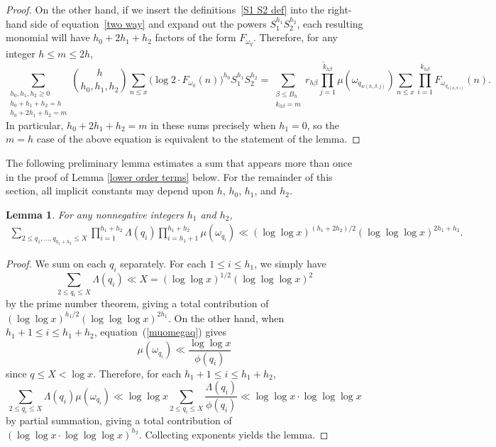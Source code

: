 \documentclass[12pt,reqno]{amsart}
\newtheorem{lemma}[theorem]{Lemma}
\theoremstyle{definition}
\begin{document}
\begin{proof}
On the other hand, if we insert the definitions~\eqref{S1 S2 def} into the right-hand side of equation~\eqref{two way} and expand out the powers $S_1^{h_1}S_2^{h_2}$, each resulting monomial will have $h_0+2h_1+h_2$ factors of the form $F_{\omega_q}$. Therefore, for any integer $h\le m\le 2h$,
\[
\sum_{\substack{h_0,h_1,h_2\ge0 \\ h_0+h_1+h_2=h \\ h_0+2h_1+h_2=m}} \binom h{h_0,h_1,h_2} \sum_{n \leq x} \big( \log 2 \cdot F_{\omega_0}(n) \big)^{h_0} S_1^{h_1}S_2^{h_2}
= 
\sum_{\substack{\beta\le B_h \\ k_{h\beta}=m}} r_{h\beta} \prod_{j=1}^{\tilde k_{h\beta}} \mu(\omega_{q_{w(h,\beta, j)}}) \sum_{n \leq x} \prod_{i=1}^{k_{h\beta}} F_{\omega_{q_{v(h,\beta, i)}}}(n).
\]
In particular, $h_0+2h_1+h_2=m$ in these sums precisely when $h_1=0$, so the $m=h$ case of the above equation is equivalent to the statement of the lemma.
\end{proof}

The following preliminary lemma estimates a sum that appears more than once in the proof of Lemma \ref{lower order terms} below. For the remainder of this section, all implicit constants may depend upon $h$, $h_0$, $h_1$, and $h_2$.

\begin{lemma}\label{sumlambdamu}
For any nonnegative integers $h_1$ and $h_2$,
\begin{align*}
\sum_{2\le q_1, \ldots, q_{h_1 + h_2} \leq X} \prod_{i = 1}^{h_1 + h_2} \Lambda(q_i) \prod_{i = h_1 + 1}^{h_1 + h_2} \mu(\omega_{q_i}) \ll (\log\log x)^{(h_1 + 2h_2)/2}(\log\log\log x)^{2h_1 + h_2}.
\end{align*}
\end{lemma}

\begin{proof}
We sum on each $q_i$ separately. For each $1 \leq i \leq h_1$, we simply have
\[
\sum_{2\le q_i \leq X} \Lambda(q_i) \ll X = (\log\log x)^{1/2}(\log\log\log x)^2
\]
by the prime number theorem, giving a total contribution of $(\log\log x)^{h_1/2}(\log\log\log x)^{2h_1}$. On the other hand, when $h_1 + 1 \leq i \leq h_1 + h_2$, equation~(\ref{muomegaq}) gives
\[
\mu(\omega_{q_i}) \ll \frac{\log\log x}{\phi(q_i)}
\]
since $q\le X<\log x$.
Therefore, for each $h_1 + 1 \leq i \leq h_1 + h_2$,
\[
\sum_{2\le q_i \leq X} \Lambda(q_i) \mu(\omega_{q_i}) \ll \log\log x \sum_{2\le q_i \leq X} \frac{\Lambda(q_i)}{\phi(q_i)} \ll \log\log x \cdot \log\log\log x
\]
by partial summation, giving a total contribution of $(\log\log x \cdot \log\log\log x)^{h_2}$. Collecting exponents yields the lemma.
\end{proof}
\end{document}
